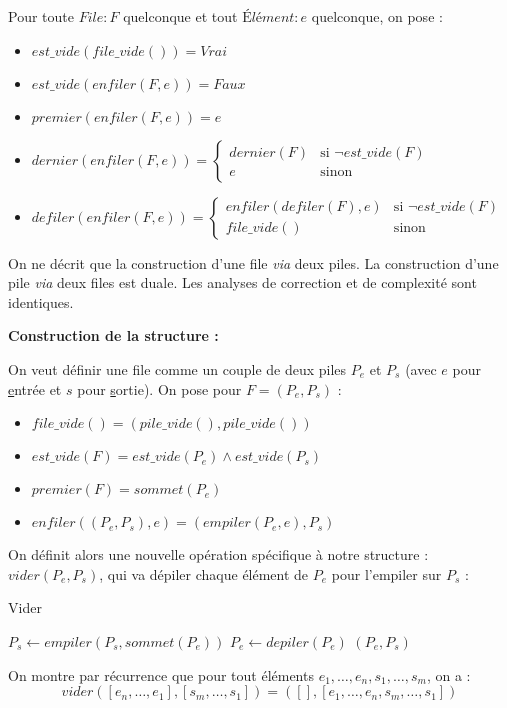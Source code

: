 \documentclass[../main.tex]{subfiles}
\begin{document}
Pour toute $File:F$ quelconque et tout $\textit{Élément}:e$ quelconque, on pose :
\begin{itemize}
	\item $est\_vide(file\_vide()) = \textit{Vrai}$
	\item $est\_vide(enfiler(F, e)) = \textit{Faux}$
	\item $premier(enfiler(F, e)) = e$
	\item $dernier(enfiler(F, e)) = \left\{\begin{array}{ll}dernier(F) & \text{si $\neg est\_vide(F)$} \\ e & \text{sinon}\end{array}\right.$
	\item $defiler(enfiler(F, e)) = \left\{\begin{array}{ll}enfiler(defiler(F), e) & \text{si $\neg est\_vide(F)$} \\ file\_vide() & \text{sinon}\end{array}\right.$
\end{itemize}


On ne décrit que la construction d'une file \textit{via} deux piles. La construction d'une pile \textit{via} deux files est duale. Les analyses de correction et de complexité sont identiques.

\textbf{Construction de la structure :}

On veut définir une file comme un couple de deux piles $P_e$ et $P_s$ (avec $e$ pour \underline{e}ntrée et $s$ pour \underline{s}ortie). On pose pour $F = (P_e, P_s)$ :
\begin{itemize}
	\item $file\_vide() = (pile\_vide(), pile\_vide())$
	\item $est\_vide(F) = est\_vide(P_e)\wedge est\_vide(P_s)$
	\item $premier(F) = sommet(P_e)$
	\item $enfiler((P_e, P_s), e) = (empiler(P_e, e), P_s)$
\end{itemize}
On définit alors une nouvelle opération spécifique à notre structure : $vider(P_e, P_s)$, qui va dépiler chaque élément de $P_e$ pour l'empiler sur $P_s$ :

\begin{algorithm}
\caption{Vider}\label{alg:vider_piles}
 {
	$P_s \leftarrow empiler(P_s, sommet(P_e))$\;
	$P_e \leftarrow depiler(P_e)$\;
}
\Return $(P_e, P_s)$\;
\end{algorithm}
On montre par récurrence que pour tout éléments $e_1, \dots, e_n, s_1, \dots, s_m$, on a :
$$vider([e_n, \dots, e_1], [s_m, \dots, s_1]) = ([], [e_1, \dots, e_n, s_m, \dots, s_1])$$
\end{document}
